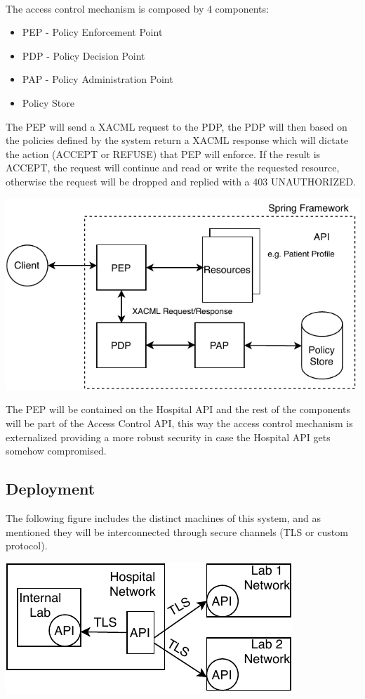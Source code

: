\\
The access control mechanism is composed by 4 components:
\begin{itemize}
	\item PEP - Policy Enforcement Point
	\item PDP - Policy Decision Point
	\item PAP - Policy Administration Point
	\item Policy Store
\end{itemize}

The PEP will send a XACML\cite{xacml} request to the PDP, the PDP will then based on the policies defined by the system return a XACML response which will dictate the action (ACCEPT or REFUSE) that PEP will enforce. If the result is ACCEPT, the request will continue and read or write the requested resource, otherwise the request will be dropped and replied with a 403 UNAUTHORIZED.

	\includegraphics[width=.6\textwidth]{figs/access_control.pdf}


The PEP will be contained on the Hospital API and the rest of the components will be part of the Access Control API, this way the access control mechanism is externalized providing a more robust security in case the Hospital API gets somehow compromised. \\

\subsection{Deployment}
The following figure includes the distinct machines of this system, and as mentioned they will be interconnected through secure channels (TLS or custom protocol).

	\includegraphics[width=.4\textwidth]{figs/infrastructure.pdf}

